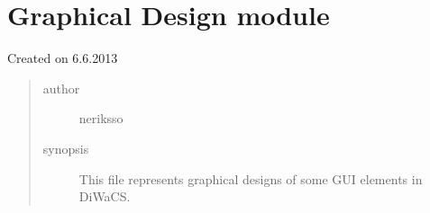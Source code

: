 \documentclass[letterpaper,10pt,english]{sphinxmanual}
\begin{document}
\section{Graphical Design module}
\label{graphicaldesign:graphical-design-module}\label{graphicaldesign:module-graphicaldesign}\label{graphicaldesign::doc}
Created on 6.6.2013
\begin{quote}\begin{description}
\item[{author}] \leavevmode
neriksso

\item[{synopsis}] \leavevmode
This file represents graphical designs of some GUI elements in DiWaCS.

\end{description}\end{quote}
\end{document}
